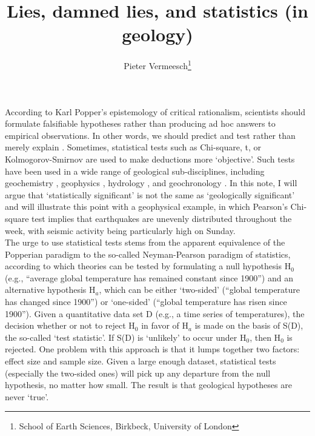 \documentclass{article}
\title{Lies, damned lies, and statistics (in geology)}
\author{Pieter Vermeesch\footnote{School of Earth Sciences,
Birkbeck, University of London}}
\date{}
\begin{document}
\maketitle

According to Karl Popper's epistemology of critical rationalism,
scientists should formulate falsifiable hypotheses rather than
producing ad hoc answers to empirical observations. In other words, we
should predict and test rather than merely explain \citep{popper1959}.
Sometimes, statistical tests such as Chi-square, t, or
Kolmogorov-Smirnov are used to make deductions more `objective'. Such
tests have been used in a wide range of geological sub-disciplines,
including geochemistry \citep{reimann2000}, geophysics
\citep{Anderson1999}, hydrology \citep{lorup1998}, and geochronology
\citep{sircombe2004}.  In this note, I will argue that `statistically
significant' is not the same as `geologically significant' and will
illustrate this point with a geophysical example, in which Pearson's
Chi-square test implies that earthquakes are unevenly distributed
throughout the week, with seismic activity being particularly high on
Sunday.
\\

The urge to use statistical tests stems from the apparent equivalence
of the Popperian paradigm to the so-called Neyman-Pearson paradigm of
statistics, according to which theories can be tested by formulating a
null hypothesis H$_0$ (e.g., ``average global temperature has remained
constant since 1900'') and an alternative hypothesis H$_a$, which can
be either `two-sided' (``global temperature has changed since 1900'')
or `one-sided' (``global temperature has risen since 1900'').  Given a
quantitative data set D (e.g., a time series of temperatures), the
decision whether or not to reject H$_0$ in favor of H$_a$ is made on
the basis of S(D), the so-called `test statistic'.  If S(D) is
`unlikely' to occur under H$_0$, then H$_0$ is rejected.  One problem
with this approach is that it lumps together two factors: effect size
and sample size.  Given a large enough dataset, statistical tests
(especially the two-sided ones) will pick up any departure from the
null hypothesis, no matter how small.  The result is that geological
hypotheses are never `true'.
\\
\end{document}
